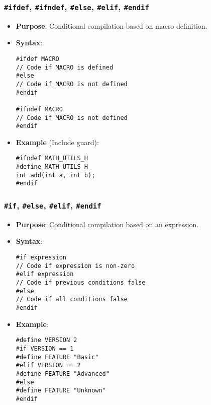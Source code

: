 \documentclass[a4paper,12pt]{article}
\begin{document}
\subsubsection{\texttt{\#ifdef}, \texttt{\#ifndef}, \texttt{\#else}, \texttt{\#elif}, \texttt{\#endif}}
\begin{itemize}[noitemsep]
    \item \textbf{Purpose}: Conditional compilation based on macro definition.
    \item \textbf{Syntax}:

\begin{lstlisting}[caption=Macro example]
#ifdef MACRO
// Code if MACRO is defined
#else
// Code if MACRO is not defined
#endif

#ifndef MACRO
// Code if MACRO is not defined
#endif
    \end{lstlisting}
    
    \item \textbf{Example} (Include guard):

\begin{lstlisting}[caption=Include guard]
#ifndef MATH_UTILS_H
#define MATH_UTILS_H
int add(int a, int b);
#endif
\end{lstlisting}

\end{itemize}

\subsubsection{\texttt{\#if}, \texttt{\#else}, \texttt{\#elif}, \texttt{\#endif}}
\begin{itemize}[noitemsep]
    \item \textbf{Purpose}: Conditional compilation based on an expression.
    \item \textbf{Syntax}:

\begin{lstlisting}[caption=Conditional compilation]
#if expression
// Code if expression is non-zero
#elif expression
// Code if previous conditions false
#else
// Code if all conditions false
#endif
\end{lstlisting}
    
\item \textbf{Example}:


\begin{lstlisting}[caption=USe case of conditional compilation]
#define VERSION 2
#if VERSION == 1
#define FEATURE "Basic"
#elif VERSION == 2
#define FEATURE "Advanced"
#else
#define FEATURE "Unknown"
#endif
\end{lstlisting}

\end{itemize}
\end{document}
